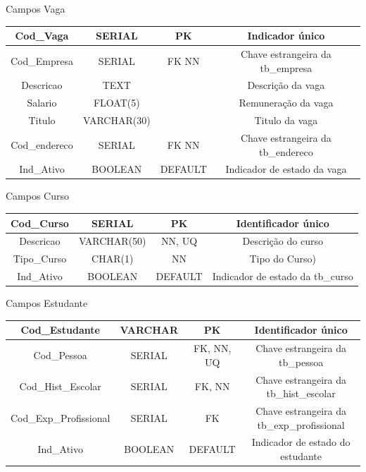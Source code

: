 \begin{quadro}[H]
	\caption{Campos Vaga}
	\centering
	\begin{tabular}{| c | c | c | c |}
		\hline
		Cod\_Vaga     & SERIAL      & PK      & Indicador único                 \\ \hline
		Cod\_Empresa  & SERIAL      & FK NN   & Chave estrangeira da tb\_empresa  \\ \hline
		Descricao     & TEXT        &         & Descrição da vaga                       \\ \hline
		Salario       & FLOAT(5)    &         & Remuneração da vaga                     \\ \hline
		Titulo        & VARCHAR(30) &         & Titulo da vaga                          \\ \hline
		Cod\_endereco & SERIAL      & FK NN   & Chave estrangeira da tb\_endereco \\ \hline
		Ind\_Ativo    & BOOLEAN     & DEFAULT & Indicador de estado da vaga             \\ \hline
	\end{tabular}
	\label{Campos Vaga}
\end{quadro}

\begin{quadro}[H]
	\caption{Campos Curso}
	\centering
	\begin{tabular}{| c | c | c | c |}
		\hline
		Cod\_Curso  & SERIAL      & PK      & Identificador único\\ \hline
		Descricao   & VARCHAR(50) & NN, UQ  & Descrição do curso                                            \\ \hline
		Tipo\_Curso & CHAR(1)     & NN      & Tipo do Curso) \\ \hline
		Ind\_Ativo  & BOOLEAN     & DEFAULT & Indicador de estado da tb\_curso                              \\ \hline
	\end{tabular}
	\label{Campos Curso}
\end{quadro}

\begin{quadro}[H]
	\caption{Campos Estudante}
	
	\begin{tabular}{| c | c | c | c |}
		\hline
		Cod\_Estudante         & VARCHAR & PK         & Identificador único  \\ \hline
		Cod\_Pessoa            & SERIAL  & FK, NN, UQ & Chave estrangeira da tb\_pessoa            \\ \hline
		Cod\_Hist\_Escolar     & SERIAL  & FK, NN     & Chave estrangeira da tb\_hist\_escolar     \\ \hline
		Cod\_Exp\_Profissional & SERIAL  & FK         & Chave estrangeira  da tb\_exp\_profissional \\ \hline
		Ind\_Ativo             & BOOLEAN & DEFAULT    & Indicador de estado do estudante                 \\ \hline
	\end{tabular}
	\label{Campos Estudante}
\end{quadro}

